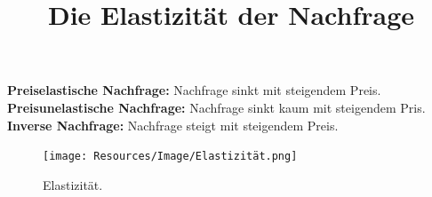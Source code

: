 \documentclass[../ZF_Wing.tex]{subfiles}
\begin{document}
\title{\textbf{Die Elastizität der Nachfrage \\}}

\textbf{Preiselastische Nachfrage: } Nachfrage sinkt  mit steigendem Preis. \\

\textbf{Preisunelastische Nachfrage: } Nachfrage sinkt kaum mit steigendem Pris. \\

\textbf{Inverse Nachfrage: } Nachfrage steigt mit steigendem Preis.


\begin{figure}[H]
\centering
\texttt{[image: Resources/Image/Elastizität.png]}
\caption{\label{fig:Elastizität}Elastizität.}
\end{figure}
\end{document}
